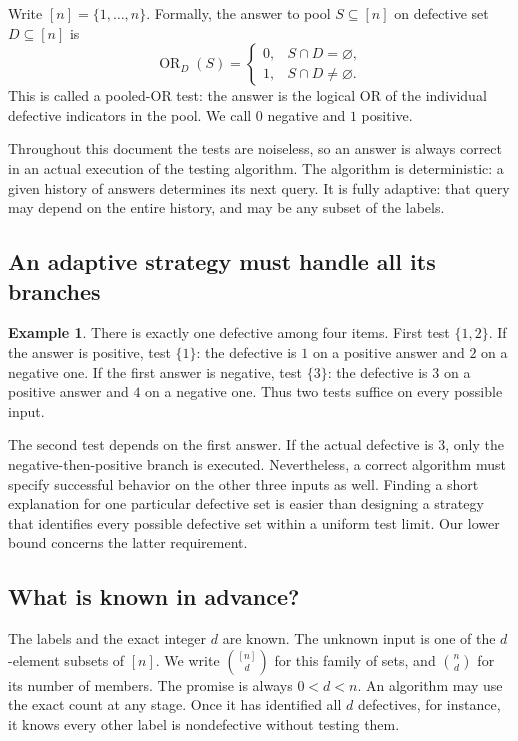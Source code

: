 \documentclass[11pt]{article}
\theoremstyle{definition}
\newtheorem{example}[theorem]{Example}
\theoremstyle{remark}
\newcommand{\OR}{\operatorname{OR}}
\numberwithin{equation}{section}
\begin{document}
Write \([n]=\{1,\ldots,n\}\). Formally, the answer to pool
\(S\subseteq[n]\) on defective set \(D\subseteq[n]\) is
\[
 \OR_D(S)=
 \begin{cases}
 0,&S\cap D=\varnothing,\\
 1,&S\cap D\ne\varnothing.
 \end{cases}
\]
This is called a pooled-\(\mathrm{OR}\) test: the answer is the logical
OR of the individual defective indicators in the pool. We call \(0\)
negative and \(1\) positive.

Throughout this document the tests are noiseless, so an answer is
always correct in an actual execution of the testing algorithm.
The algorithm is deterministic: a given history of answers determines
its next query. It is fully adaptive: that query may depend on the
entire history, and may be any subset of the labels.

\subsection{An adaptive strategy must handle all its branches}

\begin{example}\label{ex:four}
There is exactly one defective among four items. First test
\(\{1,2\}\).
If the answer is positive, test \(\{1\}\): the defective is \(1\)
on a positive answer and \(2\) on a negative one.
If the first answer is negative, test \(\{3\}\): the defective is
\(3\) on a positive answer and \(4\) on a negative one.
Thus two tests suffice on every possible input.
\end{example}

The second test depends on the first answer. If the actual defective
is \(3\), only the negative-then-positive branch is executed.
Nevertheless, a correct algorithm must specify successful behavior
on the other three inputs as well. Finding a short explanation for
one particular defective set is easier than designing a strategy
that identifies every possible defective set within a uniform test
limit. Our lower bound concerns the latter requirement.

\subsection{What is known in advance?}

The labels and the exact integer \(d\) are known. The unknown input is
one of the \(d\)-element subsets of \([n]\). We write
\(\binom{[n]}d\) for this family of sets, and \(\binom nd\) for its
number of members. The promise is always \(0<d<n\).
An algorithm may use the exact count at any stage. Once it has
identified all \(d\) defectives, for instance, it knows every other
label is nondefective without testing them.
\end{document}
